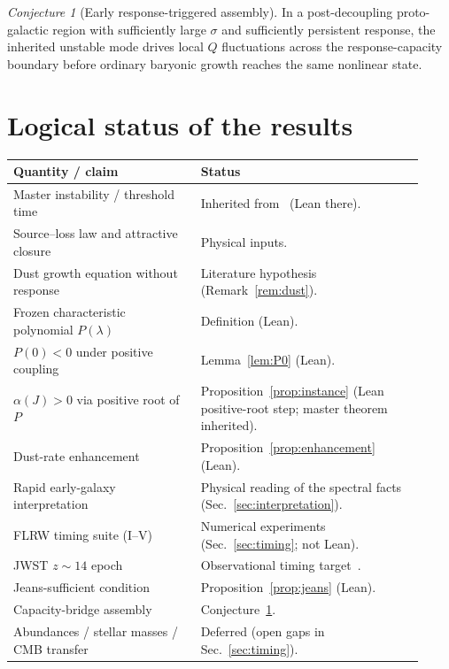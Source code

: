\documentclass[11pt]{article}
\theoremstyle{definition}
\theoremstyle{remark}
\newtheorem{conjecture}{Conjecture}
\begin{document}
\begin{conjecture}[Early response-triggered assembly]
\label{conj:assembly}
In a post-decoupling proto-galactic region with sufficiently large $\sigma$ and sufficiently persistent response, the inherited unstable mode drives local $Q$ fluctuations across the response-capacity boundary before ordinary baryonic growth reaches the same nonlinear state.
\end{conjecture}

\section{Logical status of the results}
\label{sec:status}
\begin{center}
\small
\begin{tabular}{@{}p{0.42\linewidth}p{0.50\linewidth}@{}}
\toprule
\textbf{Quantity / claim} & \textbf{Status}\\
\midrule
Master instability / threshold time & Inherited from~\cite{boyd2026response} (Lean there).\\
Source--loss law and attractive closure & Physical inputs.\\
Dust growth equation without response & Literature hypothesis (Remark~\ref{rem:dust}).\\
Frozen characteristic polynomial $P(\lambda)$ & Definition (Lean).\\
$P(0)<0$ under positive coupling & Lemma~\ref{lem:P0} (Lean).\\
$\alpha(J)>0$ via positive root of $P$ & Proposition~\ref{prop:instance} (Lean positive-root step; master theorem inherited).\\
Dust-rate enhancement & Proposition~\ref{prop:enhancement} (Lean).\\
Rapid early-galaxy interpretation & Physical reading of the spectral facts (Sec.~\ref{sec:interpretation}).\\
FLRW timing suite (I--V) & Numerical experiments (Sec.~\ref{sec:timing}; not Lean).\\
JWST $z\sim14$ epoch & Observational timing target~\cite{Carniani2024}.\\
Jeans-sufficient condition & Proposition~\ref{prop:jeans} (Lean).\\
Capacity-bridge assembly & Conjecture~\ref{conj:assembly}.\\
Abundances / stellar masses / CMB transfer & Deferred (open gaps in Sec.~\ref{sec:timing}).\\
\bottomrule
\end{tabular}
\end{center}
\end{document}
